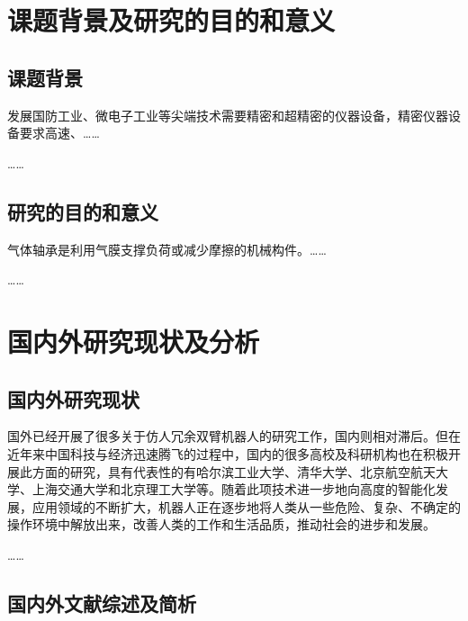 
\section{课题背景及研究的目的和意义}

\subsection{课题背景}

发展国防工业、微电子工业等尖端技术需要精密和超精密的仪器设备，精密仪器设备要求高速、……

……

\hitenter

\subsection{研究的目的和意义}

气体轴承是利用气膜支撑负荷或减少摩擦的机械构件。……

……

\section{国内外研究现状及分析}

\subsection{国内外研究现状}

国外已经开展了很多关于仿人冗余双臂机器人的研究工作，国内则相对滞后。但在近年来中国科技与经济迅速腾飞的过程中，国内的很多高校及科研机构也在积极开展此方面的研究，具有代表性的有哈尔滨工业大学、清华大学、北京航空航天大学、上海交通大学和北京理工大学等。随着此项技术进一步地向高度的智能化发展，应用领域的不断扩大，机器人正在逐步地将人类从一些危险、复杂、不确定的操作环境中解放出来，改善人类的工作和生活品质，推动社会的进步和发展。

……

\hitenter

\subsection{国内外文献综述及简析}

